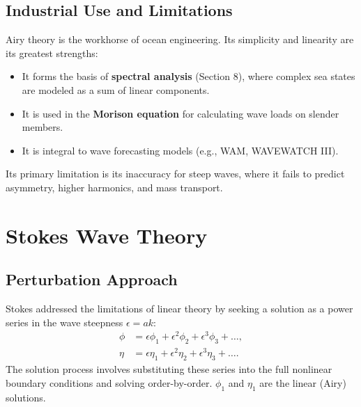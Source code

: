 \documentclass[11pt,a4paper]{article}
\begin{document}
\subsection{Industrial Use and Limitations}
Airy theory is the workhorse of ocean engineering. Its simplicity and linearity are its greatest strengths:
\begin{itemize}
    \item It forms the basis of \textbf{spectral analysis} (Section 8), where complex sea states are modeled as a sum of linear components.
    \item It is used in the \textbf{Morison equation} for calculating wave loads on slender members.
    \item It is integral to wave forecasting models (e.g., WAM, WAVEWATCH III).
\end{itemize}
Its primary limitation is its inaccuracy for steep waves, where it fails to predict asymmetry, higher harmonics, and mass transport.

\section{Stokes Wave Theory}
\subsection{Perturbation Approach}
Stokes addressed the limitations of linear theory by seeking a solution as a power series in the wave steepness $\epsilon = ak$:
\begin{align}
\phi &= \epsilon \phi_1 + \epsilon^2 \phi_2 + \epsilon^3 \phi_3 + \dots, \\
\eta &= \epsilon \eta_1 + \epsilon^2 \eta_2 + \epsilon^3 \eta_3 + \dots.
\end{align}
The solution process involves substituting these series into the full nonlinear boundary conditions and solving order-by-order. $\phi_1$ and $\eta_1$ are the linear (Airy) solutions.
\end{document}
